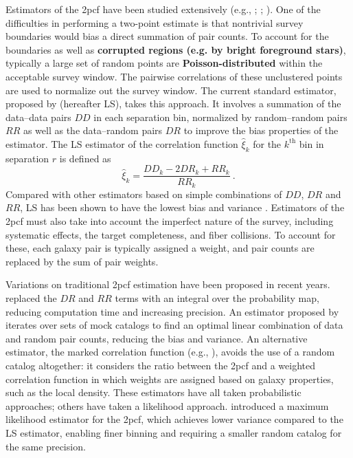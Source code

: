\documentclass[modern]{aastex62}
\newcommand{\cf}{2pcf\xspace}
\newcommand{\LS}{LS\xspace}
\newcommand{\new}[1]{\textbf{#1}}
\begin{document}
Estimators of the \cf have been studied extensively (e.g., \citealt{PeeblesHauser1974}; \citealt{DavisPeebles1983}; \citealt{Hamilton1993}).
One of the difficulties in performing a two-point estimate is that nontrivial survey boundaries would bias a direct summation of pair counts.
To account for the boundaries as well as \new{corrupted regions (e.g. by bright foreground stars)}, typically a large set of random points are \new{Poisson-distributed} within the acceptable survey window.
The pairwise correlations of these unclustered points are used to normalize out the survey window.
The current standard estimator, proposed by \cite{LandySzalay1993} (hereafter \LS), takes this approach.
It involves a summation of the data--data pairs $DD$ in each separation bin, normalized by random--random pairs $RR$ as well as the data--random pairs $DR$ to improve the bias properties of the estimator.
The \LS estimator of the correlation function $\hat{\xi}_k$ for the $k^\mathrm{th}$ bin in separation $r$ is defined as
\begin{equation} \label{eq:lsintro}
\hat{\xi}_k = \frac{DD_k - 2DR_k + RR_k}{RR_k} ~.
\end{equation}
Compared with other estimators based on simple combinations of $DD$, $DR$ and $RR$, \LS has been shown to have the lowest bias and variance \citep{Kerscher2000}.
Estimators of the \cf must also take into account the imperfect nature of the survey, including systematic effects, the target completeness, and fiber collisions.
To account for these, each galaxy pair is typically assigned a weight, and pair counts are replaced by the sum of pair weights.

Variations on traditional \cf estimation have been proposed in recent years.
\cite{Demina2016} replaced the $DR$ and $RR$ terms with an integral over the probability map, reducing computation time and increasing precision.
An estimator proposed by \cite{VargasMagana2013} iterates over sets of mock catalogs to find an optimal linear combination of data and random pair counts, reducing the bias and variance.
An alternative estimator, the marked correlation function (e.g., \citealt{WhitePadmanabhan2009}), avoids the use of a random catalog altogether: it considers the ratio between the \cf and a weighted correlation function in which weights are assigned based on galaxy properties, such as the local density.
These estimators have all taken probabilistic approaches; others have taken a likelihood approach.
\cite{BaxterRozo2013} introduced a maximum likelihood estimator for the \cf, which achieves lower variance compared to the \LS estimator, enabling finer binning and requiring a smaller random catalog for the same precision.
\end{document}
